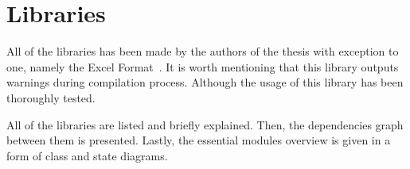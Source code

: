 \documentclass{mini}
\begin{document}
\section{Libraries}

All of the libraries has been made by the authors of the thesis with exception to one, namely the Excel Format~\cite{excel_format}. It is worth mentioning that this library outputs warnings during compilation process. Although the usage of this library has been thoroughly tested.

All of the libraries are listed and briefly explained. Then, the dependencies graph between them is presented. Lastly, the essential modules overview is given in a form of class and state diagrams.
\end{document}

